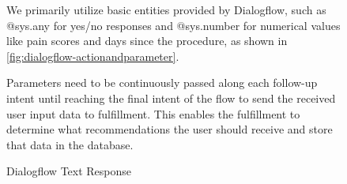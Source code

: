 \documentclass[12pt,oneside,openright,a4paper]{cpe-english-project}
\begin{document}
\begin{figure}[H]
\begin{justify}
              \makeatletter
                \qquad We primarily utilize basic entities provided by Dialogflow, such as @sys.any for yes/no responses and @sys.number for numerical values like pain scores and days since the procedure, as shown in \ref{fig:dialogflow-actionandparameter}. \par
              \makeatother
              \qquad Parameters need to be continuously passed along each follow-up intent until reaching the final intent of the flow to send the received user input data to fulfillment. This enables the fulfillment to determine what recommendations the user should receive and store that data in the database.\par
            \end{justify}     
          \end{figure}
          \begin{figure}[H]
            \centering
            \caption{Dialogflow Text Response}\label{fig:dialogflow-textresponse}       
          \end{figure}
\end{document}
